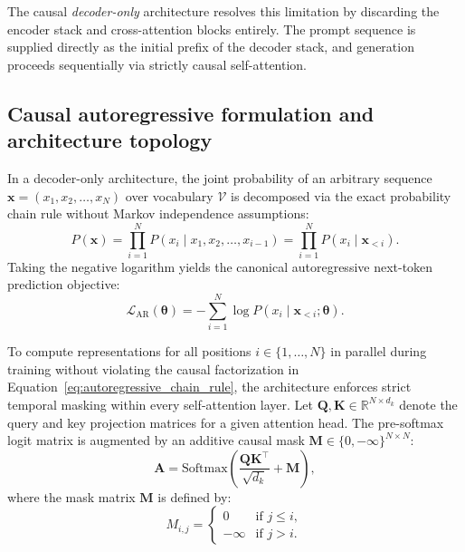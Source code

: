 \documentclass[../../../main.tex]{subfiles}
\begin{document}
The causal \emph{decoder-only} architecture resolves this limitation by discarding the encoder stack and cross-attention blocks entirely. The prompt sequence is supplied directly as the initial prefix of the decoder stack, and generation proceeds sequentially via strictly causal self-attention.


\subsection{Causal autoregressive formulation and architecture topology}
\label{subsec:causal_autoregression_topology}

In a decoder-only architecture, the joint probability of an arbitrary sequence $\mathbf{x} = (x_1, x_2, \dots, x_N)$ over vocabulary $\mathcal{V}$ is decomposed via the exact probability chain rule without Markov independence assumptions:
\begin{equation}
P(\mathbf{x}) = \prod_{i=1}^N P(x_i \mid x_1, x_2, \dots, x_{i-1}) = \prod_{i=1}^N P(x_i \mid \mathbf{x}_{<i}).
\label{eq:autoregressive_chain_rule}
\end{equation}
Taking the negative logarithm yields the canonical autoregressive next-token prediction objective:
\begin{equation}
\mathcal{L}_{\text{AR}}(\boldsymbol{\theta}) = -\sum_{i=1}^N \log P(x_i \mid \mathbf{x}_{<i}; \boldsymbol{\theta}).
\label{eq:clm_objective_formal}
\end{equation}

To compute representations for all positions $i \in \{1, \dots, N\}$ in parallel during training without violating the causal factorization in Equation~\eqref{eq:autoregressive_chain_rule}, the architecture enforces strict temporal masking within every self-attention layer. Let $\mathbf{Q}, \mathbf{K} \in \mathbb{R}^{N \times d_k}$ denote the query and key projection matrices for a given attention head. The pre-softmax logit matrix is augmented by an additive causal mask $\mathbf{M} \in \{0, -\infty\}^{N \times N}$:
\begin{equation}
\mathbf{A} = \text{Softmax}\left(\frac{\mathbf{Q}\mathbf{K}^\top}{\sqrt{d_k}} + \mathbf{M}\right),
\label{eq:causal_masked_attention}
\end{equation}
where the mask matrix $\mathbf{M}$ is defined by:
\begin{equation}
M_{i,j} = \begin{cases}
0 & \text{if } j \le i, \\
-\infty & \text{if } j > i.
\end{cases}
\label{eq:causal_mask_matrix}
\end{equation}
\end{document}
